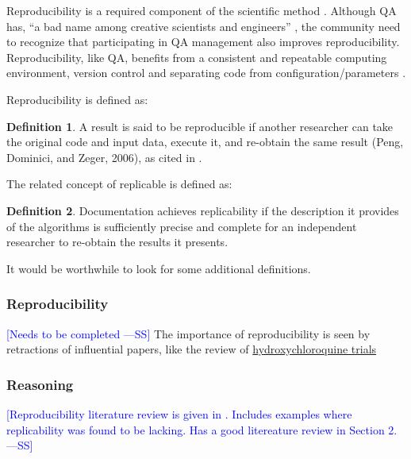 \documentclass[letterpaper, cleveref]{lipics-v2019}
\newcommand{\authornote}[3]{\textcolor{#1}{[#3 ---#2]}}
\newcommand{\authornote}[3]{}
\newcommand{\wss}[1]{\authornote{blue}{SS}{#1}} %
\theoremstyle{definition}
\newtheorem{defn}{Definition}
\begin{document}
Reproducibility is a required component of the scientific method
\citep{Davison2012}.  Although QA has, ``a bad name among creative
scientists and engineers'' \citep[p.~352]{Roache1998}, the community need to
recognize that participating in QA management also improves reproducibility.
Reproducibility, like QA, benefits from a consistent and repeatable
computing environment, version control and separating code from
configuration/parameters \citep{Davison2012}.

Reproducibility is defined as:

\begin{defn}
  A result is said to be reproducible if another researcher can take the
  original code and input data, execute it, and re-obtain the same result
  (Peng, Dominici, and Zeger, 2006), as cited in
  \citet{BenureauAndRougier2017}.
\end{defn}

The related concept of replicable is defined as:

\begin{defn}
  Documentation achieves replicability if the description it provides of the
  algorithms is sufficiently precise and complete for an independent researcher
  to re-obtain the results it presents.  \citep{BenureauAndRougier2017}
\end{defn}

It would be worthwhile to look for some additional definitions.

\begin{mybox}
\subsubsection*{Reproducibility} 
\wss{Needs to be completed}
The importance of reproducibility is seen by retractions of influential
papers, like the review of \href{https://www.theguardian
.com/commentisfree/2020/jun/05/lancet-had-to-do-one-of-the-biggest
-retractions-in-modern-history-how-could-this-happen} {hydroxychloroquine
trials}
\end{mybox}

\subsubsection*{Reasoning}

\wss{Reproducibility literature review is given in \citet{FeinbergEtAl2020}.
Includes examples where replicability was found to be lacking.  Has a good
litereature review in Section 2.}
\end{document}
